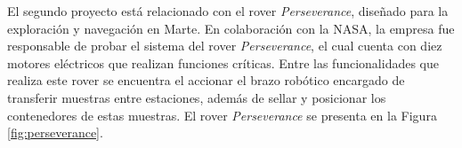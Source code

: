     \noindent
    El segundo proyecto está relacionado con el rover \textit{Perseverance}, diseñado para la exploración y navegación en Marte. En colaboración con la NASA, la empresa \textcite{maxon_group} fue responsable de probar el sistema del rover \textit{Perseverance}, el cual cuenta con diez motores eléctricos que realizan funciones críticas. Entre las funcionalidades que realiza este rover se encuentra el accionar el brazo robótico encargado de transferir muestras entre estaciones, además de sellar y posicionar los contenedores de estas muestras. El rover \textit{Perseverance} se presenta en la Figura \ref{fig:perseverance}.    
